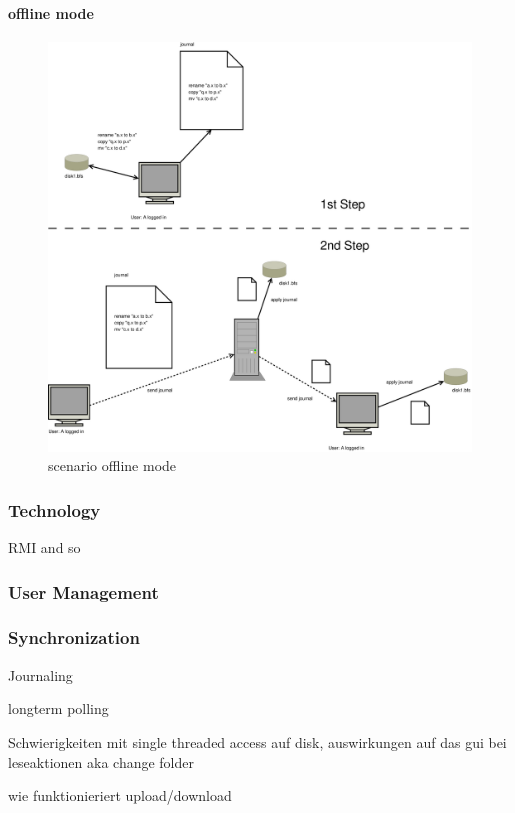 \paragraph{offline mode}

\begin{figure}[h!]
\centering
\includegraphics[width=1\textwidth]{figures/scenario_offline_mode.eps}
\caption{scenario offline mode}
\label{fig:scenario_offline_mode}
\end{figure}

\subsubsection{Technology}
RMI and so
\subsubsection{User Management}
\subsubsection{Synchronization}


Journaling

longterm polling

Schwierigkeiten mit single threaded access auf disk, auswirkungen auf das gui bei leseaktionen aka change folder


wie funktionieriert upload/download

